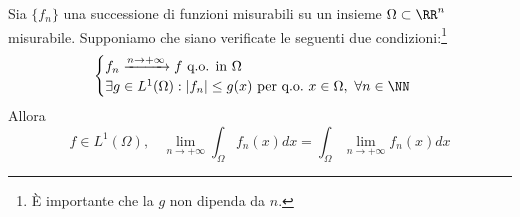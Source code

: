 \begin{thm}
 Sia $\{f_{n}\}$ una successione di funzioni misurabili su un insieme $\Omega \subset \RR^{n}$ misurabile. Supponiamo che siano verificate le seguenti due condizioni:\footnote{È importante che la $g$ non dipenda da $n$.}
\begin{equation*}
\begin{cases}
f_{n}\xrightarrow{n\rightarrow + \infty} f\ \text{q.o. in} \ \Omega \\
\exists g\in L^{1}(\Omega) :| f_{n}| \leq g(x) \ \text{per q.o.} \ x\in \Omega, \ \forall n\in \NN
\end{cases}
\end{equation*}
Allora
\begin{equation*}
f\in L^{1}(\Omega), \ \ \ \ \lim_{n\rightarrow + \infty}\int_{\Omega} f_{n}(x) dx = \int_{\Omega}\lim_{n\rightarrow + \infty} f_{n}(x) dx
\end{equation*}
\end{thm}
